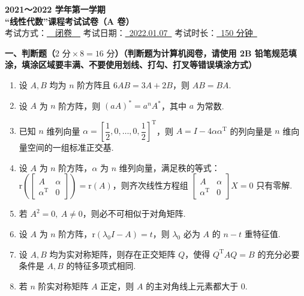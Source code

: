 \documentclass[a4paper,11pt]{ctexart}
\newcommand{\rk}{\mathrm{r}}
\newcommand{\T}{\mathrm{T}}
\begin{document}
\begin{center}
  {\Large\bfseries 2021～2022 学年第一学期}\\[0.4em]
  {\Large\bfseries “线性代数”课程考试试卷（A 卷）}\\[1.0em]
  {\normalsize
    考试方式：\underline{\ \ 闭卷\ \ }\quad
    考试日期：\underline{\ 2022.01.07\ }\quad
    考试时长：\underline{\ 150 分钟\ }
  }
\end{center}

\vspace{0.8em}

\textbf{一、判断题（$2\text{ 分}\times 8 = 16\text{ 分}$）（判断题为计算机阅卷，请使用 2B 铅笔规范填涂，填涂区域要丰满、不要使用划线、打勾、打叉等错误填涂方式）}

\begin{enumerate}[label=\arabic*., leftmargin=2em, itemsep=0.5em, topsep=0.6em]
  \item 设 $A, B$ 均为 $n$ 阶方阵且 $6AB = 3A + 2B$，则 $AB = BA$.

  \item 设 $A$ 为 $n$ 阶方阵，则 $(aA)^* = a^n A^*$，其中 $a$ 为常数.

  \item 已知 $n$ 维列向量 $\alpha = \left[\dfrac{1}{2}, 0, \dots, 0, \dfrac{1}{2}\right]^{\T}$，则 $A = I - 4\alpha\alpha^{\T}$ 的列向量是 $n$ 维向量空间的一组标准正交基.

  \item 设 $A$ 为 $n$ 阶方阵，$\alpha$ 为 $n$ 维列向量，满足秩的等式：$\rk\left(\begin{bmatrix} A & \alpha \\ \alpha^{\T} & 0 \end{bmatrix}\right) = \rk(A)$，则齐次线性方程组 $\begin{bmatrix} A & \alpha \\ \alpha^{\T} & 0 \end{bmatrix} X = 0$ 只有零解.

  \item 若 $A^2 = 0,\ A \neq 0$，则必不可相似于对角矩阵.

  \item 设 $A$ 为 $n$ 阶方阵，$\rk(\lambda_0 I - A) = t$，则 $\lambda_0$ 必为 $A$ 的 $n - t$ 重特征值.

  \item 设 $A, B$ 均为实对称矩阵，则存在正交矩阵 $Q$，使得 $Q^{\T} A Q = B$ 的充分必要条件是 $A, B$ 的特征多项式相同.

  \item 若 $n$ 阶实对称矩阵 $A$ 正定，则 $A$ 的主对角线上元素都大于 $0$.
\end{enumerate}
\end{document}
